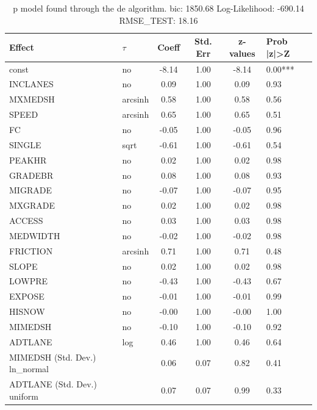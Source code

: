 \begin{table}
	\caption{p model found through the de algorithm. bic: 1850.68 Log-Likelihood: -690.14 RMSE_TEST: 18.16}
	\begin{center}
		\begin{tabular}{|l|l|c|c|c|l|}
			\hline
			Effect & $\tau$ & Coeff & Std. Err & z-values & Prob |z|>Z \\
			\hline
			const & no & -8.14 & 1.00 & -8.14 & 0.00*** \\
			\hline
			INCLANES & no & 0.09 & 1.00 & 0.09 & 0.93 \\
			\hline
			MXMEDSH & arcsinh & 0.58 & 1.00 & 0.58 & 0.56 \\
			\hline
			SPEED & arcsinh & 0.65 & 1.00 & 0.65 & 0.51 \\
			\hline
			FC & no & -0.05 & 1.00 & -0.05 & 0.96 \\
			\hline
			SINGLE & sqrt & -0.61 & 1.00 & -0.61 & 0.54 \\
			\hline
			PEAKHR & no & 0.02 & 1.00 & 0.02 & 0.98 \\
			\hline
			GRADEBR & no & 0.08 & 1.00 & 0.08 & 0.93 \\
			\hline
			MIGRADE & no & -0.07 & 1.00 & -0.07 & 0.95 \\
			\hline
			MXGRADE & no & 0.02 & 1.00 & 0.02 & 0.98 \\
			\hline
			ACCESS & no & 0.03 & 1.00 & 0.03 & 0.98 \\
			\hline
			MEDWIDTH & no & -0.02 & 1.00 & -0.02 & 0.98 \\
			\hline
			FRICTION & arcsinh & 0.71 & 1.00 & 0.71 & 0.48 \\
			\hline
			SLOPE & no & 0.02 & 1.00 & 0.02 & 0.98 \\
			\hline
			LOWPRE & no & -0.43 & 1.00 & -0.43 & 0.67 \\
			\hline
			EXPOSE & no & -0.01 & 1.00 & -0.01 & 0.99 \\
			\hline
			HISNOW & no & -0.00 & 1.00 & -0.00 & 1.00 \\
			\hline
			MIMEDSH & no & -0.10 & 1.00 & -0.10 & 0.92 \\
			\hline
			ADTLANE & log & 0.46 & 1.00 & 0.46 & 0.64 \\
			\hline
			MIMEDSH (Std. Dev.) ln_normal &  & 0.06 & 0.07 & 0.82 & 0.41 \\
			\hline
			ADTLANE (Std. Dev.) uniform &  & 0.07 & 0.07 & 0.99 & 0.33 \\
			\hline
		\end{tabular}
	\end{center}
\end{table}